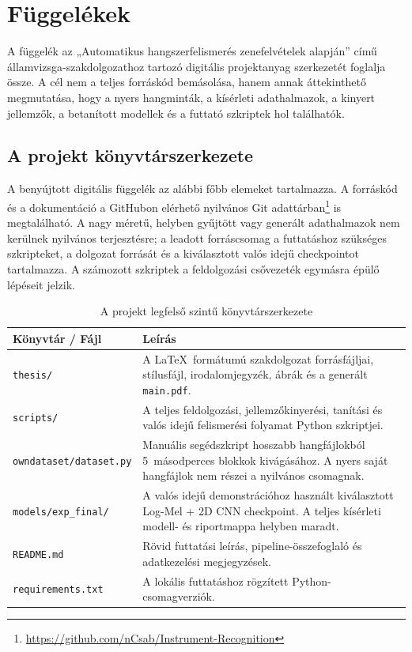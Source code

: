 \appendix

\chapter{Függelékek}
\label{chap:fuggelek}

A függelék az „Automatikus hangszerfelismerés zenefelvételek alapján” című
államvizsga-szakdolgozathoz tartozó digitális projektanyag szerkezetét foglalja
össze. A cél nem a teljes forráskód bemásolása, hanem annak áttekinthető
megmutatása, hogy a nyers hangminták, a kísérleti adathalmazok, a kinyert
jellemzők, a betanított modellek és a futtató szkriptek hol találhatók.

\section{A projekt könyvtárszerkezete}
\label{sec:konyvtarszerkezet}

A benyújtott digitális függelék az alábbi főbb elemeket tartalmazza. A
forráskód és a dokumentáció a GitHubon elérhető nyilvános Git
adattárban\footnote{\url{https://github.com/nCsab/Instrument-Recognition}} is
megtalálható. A nagy méretű, helyben gyűjtött vagy generált adathalmazok nem
kerülnek nyilvános terjesztésre; a leadott forráscsomag a futtatáshoz szükséges
szkripteket, a dolgozat forrását és a kiválasztott valós idejű checkpointot
tartalmazza. A számozott szkriptek a feldolgozási csővezeték egymásra épülő
lépéseit jelzik.

\begin{table}[ht!]
\centering
\small
\caption{A projekt legfelső szintű könyvtárszerkezete}
\label{tab:konyvtarszerkezet}
\begin{tabular}{p{4.5cm}p{10cm}}
\toprule
\textbf{Könyvtár / Fájl} & \textbf{Leírás} \\
\midrule
\texttt{thesis/} & A \LaTeX\ formátumú szakdolgozat forrásfájljai, stílusfájl, irodalomjegyzék, ábrák és a generált \texttt{main.pdf}. \\
\texttt{scripts/} & A teljes feldolgozási, jellemzőkinyerési, tanítási és valós idejű felismerési folyamat Python szkriptjei. \\
\texttt{owndataset/dataset.py} & Manuális segédszkript hosszabb hangfájlokból 5~másodperces blokkok kivágásához. A nyers saját hangfájlok nem részei a nyilvános csomagnak. \\
\texttt{models/exp\_final/} & A valós idejű demonstrációhoz használt kiválasztott Log-Mel + 2D CNN checkpoint. A teljes kísérleti modell- és riportmappa helyben maradt. \\
\texttt{README.md} & Rövid futtatási leírás, pipeline-összefoglaló és adatkezelési megjegyzések. \\
\texttt{requirements.txt} & A lokális futtatáshoz rögzített Python-csomagverziók. \\
\bottomrule
\end{tabular}
\end{table}
\clearpage
